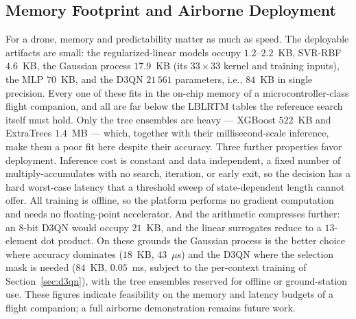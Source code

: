 \documentclass[journal]{IEEEtran}
\begin{document}
\subsection{Memory Footprint and Airborne Deployment}
\label{sec:deploy}
For a drone, memory and predictability matter as much as speed. The deployable artifacts
are small: the regularized-linear models occupy $1.2$--$2.2$~KB, SVR-RBF $4.6$~KB, the
Gaussian process $17.9$~KB (its $33\times33$ kernel and training inputs), the MLP $70$~KB,
and the D3QN $21\,561$ parameters, i.e., $84$~KB in single precision. Every one of these
fits in the on-chip memory of a microcontroller-class flight companion, and all are far
below the LBLRTM tables the reference search itself must hold. Only the tree ensembles
are heavy --- XGBoost
$522$~KB and ExtraTrees $1.4$~MB --- which, together with their millisecond-scale
inference, make them a poor fit here despite their accuracy. Three further properties
favor deployment. Inference cost is constant and data independent, a fixed number of
multiply-accumulates with no search, iteration, or early exit, so the decision has a hard
worst-case latency that a threshold sweep of state-dependent length cannot offer. All
training is offline, so the platform performs no gradient computation and needs no
floating-point accelerator. And the arithmetic compresses further: an $8$-bit D3QN would
occupy $21$~KB, and the linear surrogates reduce to a $13$-element dot product. On these
grounds the Gaussian process is the better choice where accuracy dominates ($18$~KB,
$43$~$\mu$s) and the D3QN where the selection mask is needed ($84$~KB, $0.05$~ms, subject
to the per-context training of Section~\ref{sec:d3qn}), with the tree ensembles reserved
for offline or ground-station use. These figures indicate feasibility on the memory and
latency budgets of a flight companion; a full airborne demonstration remains future work.
\end{document}

